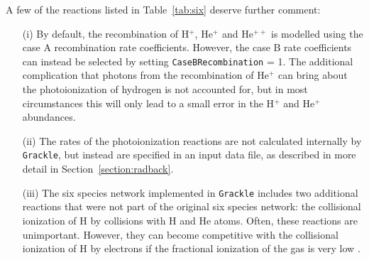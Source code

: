 A few of the reactions listed in Table~\ref{tab:six} deserve further comment:
\begin{enumerate}
\item[(i)] By default, the recombination of
H$^{+}$, He$^{+}$ and He$^{++}$ is modelled using the case A recombination rate coefficients. However, the case B
rate coefficients can instead be selected by setting \texttt{CaseBRecombination} = 1. The additional complication that photons from the recombination of
He$^{+}$ can bring about the photoionization of hydrogen \citep[discussed in some detail in][]{1989agna.book.....O} is not accounted
for, but in most circumstances this will only lead to a small error in the H$^{+}$ and He$^{+}$ abundances. 
\item[(ii)] The rates of the photoionization reactions are not calculated internally by \texttt{Grackle}, but instead are specified in an input data file,
as described in more detail in Section~\ref{section:radback}.
\item[(iii)] The six species network implemented in \texttt{Grackle} includes two additional reactions that were not part of the original \citet{1997NewA....2..181A}
six species network: the collisional ionization of H by collisions with H and He atoms. Often, these reactions are unimportant. However, they 
can become competitive with the collisional ionization of H by electrons if the fractional ionization of the gas is very low \citep[see e.g.][for an example of when this can be important]{2015MNRAS.451.2082G}.
\end{enumerate}

